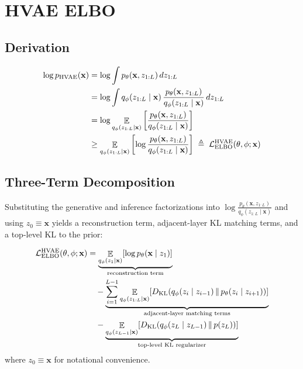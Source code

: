 \documentclass[11pt,a4paper]{article}
\DeclareMathOperator*{\E}{\mathbb{E}}
\newcommand{\bx}{\mathbf{x}} \newcommand{\by}{\mathbf{y}}
\newcommand{\KL}[2]{D_{\mathrm{KL}}\!\left(#1\,\|\,#2\right)}
\newcommand{\elboHVAE}{\cL_{\mathrm{ELBO}}^{\mathrm{HVAE}}}
\begin{document}
\section{HVAE ELBO}\label{sec:hvae-elbo}

\subsection{Derivation}

\begin{align*}
    \log p_{\mathrm{HVAE}}(\bx)
    &= \log \int p_\theta(\bx,z_{1:L})\,dz_{1:L} \\
    &= \log \int q_\phi(z_{1:L}\mid \bx)\,
       \frac{p_\theta(\bx,z_{1:L})}{q_\phi(z_{1:L}\mid \bx)}\,dz_{1:L} \\
    &= \log \E_{q_\phi(z_{1:L}\mid \bx)}
       \left[\frac{p_\theta(\bx,z_{1:L})}{q_\phi(z_{1:L}\mid \bx)}\right] \\
    &\ge \E_{q_\phi(z_{1:L}\mid \bx)}
       \left[\log\frac{p_\theta(\bx,z_{1:L})}{q_\phi(z_{1:L}\mid \bx)}\right]
       \;\triangleq\; \elboHVAE(\theta,\phi;\bx)
\end{align*}

\subsection{Three-Term Decomposition}

Substituting the generative and inference factorizations into $\log\frac{p_\theta(\bx,z_{1:L})}{q_\phi(z_{1:L}\mid \bx)}$ and using $z_0\equiv\bx$ yields a reconstruction term, adjacent-layer KL matching terms, and a top-level KL to the prior:

\begin{align*}
    \elboHVAE(\theta,\phi;\bx)
    &= \underbrace{
        \E_{q_\phi(z_1\mid \bx)}\!\left[\log p_\theta(\bx\mid z_1)\right]
       }_{\text{reconstruction term}} \\
    &\quad - \underbrace{
        \sum_{i=1}^{L-1}
        \E_{q_\phi(z_{1:L}\mid \bx)}
        \!\left[
            \KL{q_\phi(z_i\mid z_{i-1})}{p_\theta(z_i\mid z_{i+1})}
        \right]
       }_{\text{adjacent-layer matching terms}} \\
    &\quad - \underbrace{
        \E_{q_\phi(z_{L-1}\mid \bx)}
        \!\left[\KL{q_\phi(z_L\mid z_{L-1})}{p(z_L)}\right]
       }_{\text{top-level KL regularizer}}
\end{align*}
where $z_0\equiv \bx$ for notational convenience.
\end{document}
